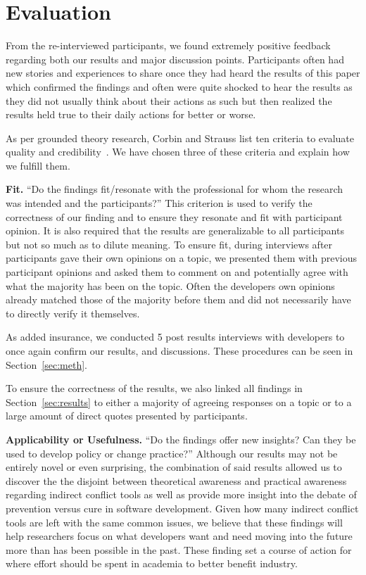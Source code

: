\documentclass[conference]{IEEEtran}
\begin{document}
\section{Evaluation}
\label{sec:eval}

From the re-interviewed participants, we found extremely positive feedback regarding both our results and major discussion
points. Participants often had new stories and experiences to share once they had heard the results of this paper which
confirmed the findings and often were quite shocked to hear the results as they did not usually think about their actions
as such but then realized the results held true to their daily actions for better or worse.

As per grounded theory research, Corbin and Strauss list ten criteria to evaluate quality and credibility~\cite{Corbin:1998:SP}.
We have chosen three of these criteria and explain how we fulfill them.

{\bfseries Fit.} ``Do the findings fit/resonate with the professional for whom the research was intended and the participants?'' This
criterion is used to verify the correctness of our finding and to ensure they resonate and fit with participant opinion. It is also
required that the results are generalizable to all participants but not so much as to dilute meaning. To ensure fit, during interviews
after participants gave their own opinions on a topic, we presented them with previous participant opinions and asked them to comment
on and potentially agree with what the majority has been on the topic. Often the developers own opinions already matched those of
the majority before them and did not necessarily have to directly verify it themselves.

As added insurance, we conducted 5 post results interviews with developers to once again confirm our results, and discussions. These
procedures can be seen in Section~\ref{sec:meth}.

To ensure the correctness of the results, we also linked all findings in Section~\ref{sec:results} to either a majority of agreeing
responses on a topic or to a large amount of direct quotes presented by participants.

{\bfseries Applicability or Usefulness.} ``Do the findings offer new insights? Can they be used to develop policy or change practice?''
Although our results may not be entirely novel or even surprising, the combination of said results allowed us to discover the
the disjoint between theoretical awareness and practical awareness regarding indirect conflict tools as well as provide more
insight into the debate of prevention versus cure in software development. Given how many indirect conflict tools are left with the same common
issues, we believe that these findings will help researchers focus on what developers want and need moving into the future more than has
been possible in the past. These finding set a course of action for where effort should be spent in academia to better benefit industry.
\end{document}
